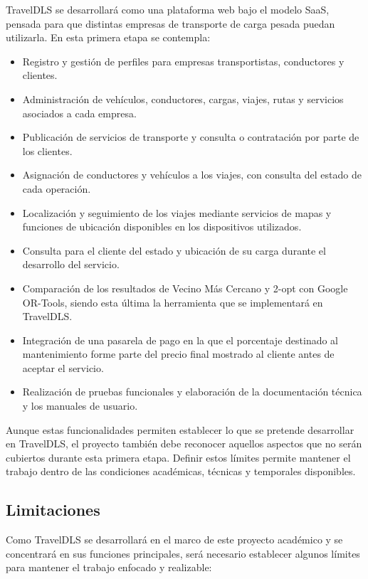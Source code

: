 TravelDLS se desarrollará como una plataforma web bajo el modelo SaaS, pensada para que distintas empresas de transporte de carga pesada puedan utilizarla. En esta primera etapa se contempla:

\begin{itemize}
	\item Registro y gestión de perfiles para empresas transportistas, conductores y clientes.
	\item Administración de vehículos, conductores, cargas, viajes, rutas y servicios asociados a cada empresa.
	\item Publicación de servicios de transporte y consulta o contratación por parte de los clientes.
	\item Asignación de conductores y vehículos a los viajes, con consulta del estado de cada operación.
	\item Localización y seguimiento de los viajes mediante servicios de mapas y funciones de ubicación disponibles en los dispositivos utilizados.
	\item Consulta para el cliente del estado y ubicación de su carga durante el desarrollo del servicio.
	\item Comparación de los resultados de Vecino Más Cercano y 2-opt con Google OR-Tools, siendo esta última la herramienta que se implementará en TravelDLS.
	\item Integración de una pasarela de pago en la que el porcentaje destinado al mantenimiento forme parte del precio final mostrado al cliente antes de aceptar el servicio.
	\item Realización de pruebas funcionales y elaboración de la documentación técnica y los manuales de usuario.
\end{itemize}

Aunque estas funcionalidades permiten establecer lo que se pretende desarrollar en TravelDLS, el proyecto también debe reconocer aquellos aspectos que no serán cubiertos durante esta primera etapa. Definir estos límites permite mantener el trabajo dentro de las condiciones académicas, técnicas y temporales disponibles.

\subsection{Limitaciones}
\label{sec:limitaciones}

Como TravelDLS se desarrollará en el marco de este proyecto académico y se concentrará en sus funciones principales, será necesario establecer algunos límites para mantener el trabajo enfocado y realizable:

